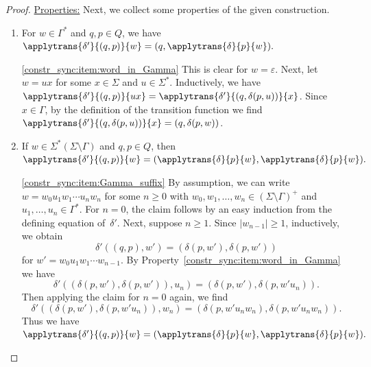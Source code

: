 \begin{proof}
	\noindent\underline{Properties:} Next, we collect some properties of the given construction.	
	\begin{enumerate} 
		
		\item \label{constr_sync:item:word_in_Gamma} For $w \in \Gamma^*$ and $q,p \in Q$, we have
		$
		\applytrans{\delta'}{(q,p)}{w}
		= (q, \applytrans{\delta}{p}{w}).
		$
		
		\begin{proofitem}{\ref{constr_sync:item:word_in_Gamma}} 
		This is clear for $w = \varepsilon$.
		Next, let $w = ux$ for some $x \in \Sigma$ and $u \in \Sigma^*$.
		Inductively, we have $\applytrans{\delta'}{(q,p)}{ux}
		= \applytrans{\delta'}{(q,\delta(p, u))}{x}$.
		Since $x \in \Gamma$,
		by the definition of the transition function
		we find $\applytrans{\delta'}{(q,\delta(p, u))}{x} = (q, \delta(p,w))$.			
		\end{proofitem}		
		
		\item \label{constr_sync:item:Gamma_suffix} If $w \in \Sigma^* (\Sigma \setminus \Gamma)$ and $q,p \in Q$, then
		$
		\applytrans{\delta'}{(q,p)}{w} = (\applytrans{\delta}{p}{w}, \applytrans{\delta}{p}{w}).
		$
				
		\begin{proofitem}{\ref{constr_sync:item:Gamma_suffix}} 
		By assumption, we can write $w = w_0 u_1 w_1 \cdots u_n w_n$ for some $n \ge 0$
		with $w_0, w_1, \ldots, w_n \in (\Sigma \setminus \Gamma)^+$
		and $u_1, \ldots, u_n \in \Gamma^*$. For $n = 0$,
		the claim follows by an easy induction from the defining equation of~$\delta'$.
		Next, suppose $n \ge 1$. Since $|w_{n-1}| \ge 1$,
		inductively, we obtain
		\[
		\delta'((q,p), w') 
		= (\delta(p, w'), \delta(p, w'))
		\]
		for $w' = w_0 u_1 w_1 \cdots w_{n-1}$. By Property~\ref{constr_sync:item:word_in_Gamma}
		we have
		\[
		\delta'((\delta(p, w'), \delta(p, w')), u_n) = (\delta(p, w'), \delta(p, w'u_n)).
		\]
		Then applying the claim for $n = 0$ again, we find 
		\[ 
		\delta'((\delta(p, w'), \delta(p, w'u_n)), w_n) = (\delta(p, w'u_n w_n), \delta(p, w'u_n w_n)).
		\]
		Thus we have
		$
		\applytrans{\delta'}{(q,p)}{w} = (\applytrans{\delta}{p}{w}, \applytrans{\delta}{p}{w}).
		$		
		\end{proofitem}		
	

\end{enumerate}
\end{proof}
